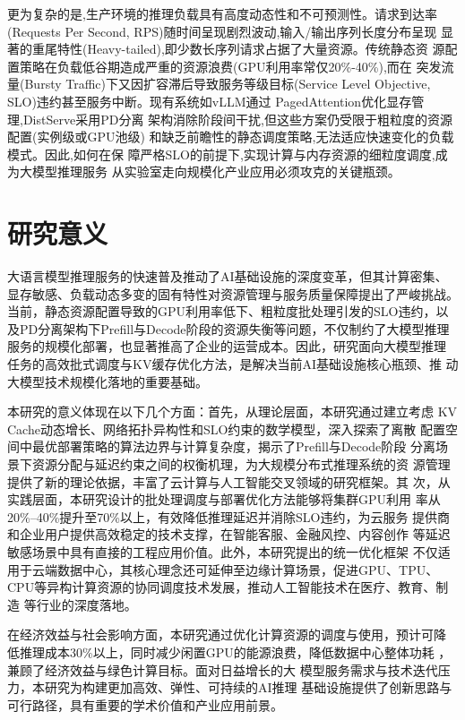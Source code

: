 更为复杂的是,生产环境的推理负载具有高度动态性和不可预测性。请求到达率
(Requests Per Second, RPS)随时间呈现剧烈波动,输入/输出序列长度分布呈现
显著的重尾特性(Heavy-tailed),即少数长序列请求占据了大量资源。传统静态资
源配置策略在负载低谷期造成严重的资源浪费(GPU利用率常仅20\%-40\%),而在
突发流量(Bursty Traffic)下又因扩容滞后导致服务等级目标(Service Level
Objective, SLO)违约甚至服务中断\cite{chen2022batch_schedule,
liu2023distributed_infer}。现有系统如vLLM\cite{kwon2023efficient}通过
PagedAttention优化显存管理,DistServe\cite{zhong2024distserve}采用PD分离
架构消除阶段间干扰,但这些方案仍受限于粗粒度的资源配置(实例级或GPU池级)
和缺乏前瞻性的静态调度策略,无法适应快速变化的负载模式。因此,如何在保
障严格SLO的前提下,实现计算与内存资源的细粒度调度,成为大模型推理服务
从实验室走向规模化产业应用必须攻克的关键瓶颈。

\section{研究意义}

大语言模型推理服务的快速普及推动了AI基础设施的深度变革，但其计算密集、
显存敏感、负载动态多变的固有特性对资源管理与服务质量保障提出了严峻挑战。
当前，静态资源配置导致的GPU利用率低下、粗粒度批处理引发的SLO违约，以
及PD分离架构下Prefill与Decode阶段的资源失衡等问题，不仅制约了大模型推理
服务的规模化部署，也显著推高了企业的运营成本。因此，研究面向大模型推理
任务的高效批式调度与KV缓存优化方法，是解决当前AI基础设施核心瓶颈、推
动大模型技术规模化落地的重要基础。

本研究的意义体现在以下几个方面：首先，从理论层面，本研究通过建立考虑
KV Cache动态增长、网络拓扑异构性和SLO约束的数学模型，深入探索了离散
配置空间中最优部署策略的算法边界与计算复杂度，揭示了Prefill与Decode阶段
分离场景下资源分配与延迟约束之间的权衡机理，为大规模分布式推理系统的资
源管理提供了新的理论依据，丰富了云计算与人工智能交叉领域的研究框架。其
次，从实践层面，本研究设计的批处理调度与部署优化方法能够将集群GPU利用
率从20\%--40\%提升至70\%以上，有效降低推理延迟并消除SLO违约，为云服务
提供商和企业用户提供高效稳定的技术支撑，在智能客服、金融风控、内容创作
等延迟敏感场景中具有直接的工程应用价值。此外，本研究提出的统一优化框架
不仅适用于云端数据中心，其核心理念还可延伸至边缘计算场景，促进GPU、TPU、
CPU等异构计算资源的协同调度技术发展，推动人工智能技术在医疗、教育、制造
等行业的深度落地。

在经济效益与社会影响方面，本研究通过优化计算资源的调度与使用，预计可降
低推理成本30\%以上，同时减少闲置GPU的能源浪费，降低数据中心整体功耗
\cite{wu2022sustainable}，兼顾了经济效益与绿色计算目标。面对日益增长的大
模型服务需求与技术迭代压力，本研究为构建更加高效、弹性、可持续的AI推理
基础设施提供了创新思路与可行路径，具有重要的学术价值和产业应用前景。

